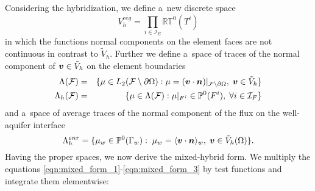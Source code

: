 \vspace{10pt}
Considering the hybridization, we define a~new discrete space
\begin{equation}
    V_h^{reg} = \prod\limits_{i\in\mathcal{I}_E} \mathbb{RT}^0(T^i)
\end{equation}
in which the functions normal components on the element faces are not continuous
in contrast to $\tilde V_h$.
Further we define a~space of traces of the normal component of $\mathbf{\boldsymbol{v}} \in\tilde V_h$ on the element boundaries
\begin{eqnarray}
    \Lambda(\mathcal{F}) &=& \{\mu\in L_2(\mathcal{F}\setminus\partial\Omega): \mu=(\mathbf{\boldsymbol{v}}\cdot\mathbf{\boldsymbol{n}})|_{\mathcal{F}\setminus\partial\Omega},\; \mathbf{\boldsymbol{v}}\in \tilde V_h\} \\
    \Lambda_h(\mathcal{F}) &=& \{\mu\in \Lambda(\mathcal{F}): \mu|_{F^i}\in\mathbb P^0(F^i),\; \forall i\in\mathcal{I}_F\}
\end{eqnarray}
and a~space of average traces of the normal component of the flux on the well-aquifer interface
\begin{equation} \label{eqn:lambda_w_space}
    \Lambda^{enr}_h = \{\mu_w\in \mathbb P^0(\Gamma_w):\;
    \mu_w=\langle\mathbf{\boldsymbol{v}}\cdot \mathbf{\boldsymbol{n}}\rangle_w,\; \mathbf{\boldsymbol{v}}\in \tilde V_h(\Omega)\}.
\end{equation}
%
Having the proper spaces, we now derive the mixed-hybrid form.
We multiply the equations \eqref{eqn:mixed_form_1}-\eqref{eqn:mixed_form_3}
by test functions and integrate them elementwise:
